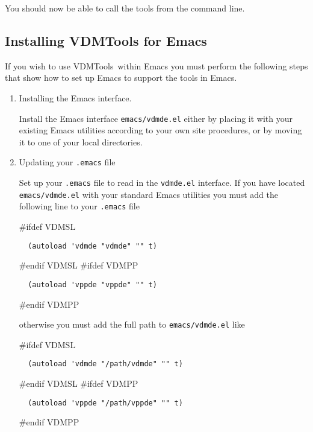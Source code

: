\documentclass[\pformat,12pt]{article}
\newcommand{\Toolbox}{VDMTools}
\newcommand{\vdmdeNineteenEl}{vdmde.el}
\newcommand{\Toolbox}{VDMTools}
\newcommand{\vdmdeNineteenEl}{vppde.el}
\newcommand{\Index}[1]{#1\index{#1}}
\begin{document}
  


You should now be able to call the tools from the command line.


\subsection{Installing VDMTools for Emacs}
\label{sec:emacsinstall}

If you wish to use \Toolbox\ within Emacs you must perform the
following steps that show how to set up Emacs to support the tools in
Emacs.

\begin{enumerate}
\item Installing the Emacs interface.
  
  Install the Emacs interface {\tt emacs/\Index{\vdmdeNineteenEl}}
  either by placing it with your existing Emacs utilities according to
  your own site procedures, or by moving it to one of your local
  directories.

\item Updating your {\tt .emacs} file
  
  Set up your {\tt .emacs} file to read in the {\tt \vdmdeNineteenEl}
  interface. If you have located {\tt emacs/\vdmdeNineteenEl} with
  your standard Emacs utilities you must add the following line to
  your {\tt .emacs} file

#ifdef VDMSL
  \begin{verbatim}
  (autoload 'vdmde "vdmde" "" t)
  \end{verbatim}
#endif VDMSL
#ifdef VDMPP
  \begin{verbatim}
  (autoload 'vppde "vppde" "" t)
  \end{verbatim}
#endif VDMPP

  otherwise you must add the full path to {\tt emacs/\vdmdeNineteenEl}
  like

#ifdef VDMSL
  \begin{verbatim}
  (autoload 'vdmde "/path/vdmde" "" t)
  \end{verbatim}
#endif VDMSL
#ifdef VDMPP
  \begin{verbatim}
  (autoload 'vppde "/path/vppde" "" t)
  \end{verbatim}
#endif VDMPP

\end{enumerate}
\end{document}
